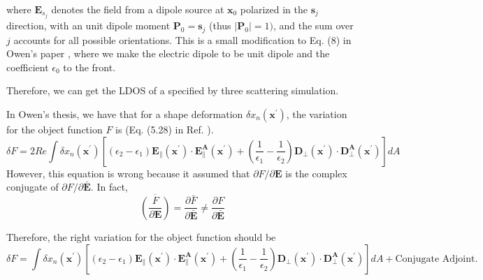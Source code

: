 \documentclass[12pt]{article}
\begin{document}
where $\mathbf{E}_{s_ j}$ denotes the field from a dipole source at $\mathbf{x}_0$ polarized in the $\mathbf{s}_j$ direction, with an unit dipole moment $\mathbf{P}_0=\mathbf{s}_j$ (thus $|\mathbf{P}_0|=1)$, and the sum over $j$ accounts for all possible orientations. This is a small modification to Eq. (8) in Owen's paper \cite{main}, where we make the electric dipole to be unit dipole and the coefficient $\epsilon_0$ to the front. 

Therefore, we can get the LDOS of a specified by three scattering simulation. %


In Owen's thesis, we have that for a shape deformation $\delta x_n(\mathbf{x}^\prime)$, the variation for the object function $F$ is (Eq. (5.28) in Ref. \cite{thesis}). 
\begin{equation}
\delta F = 2Re\int \delta x_n(\mathbf{x}^\prime) [(\epsilon_2 -\epsilon_1) \mathbf{E}_{\parallel}(\mathbf{x}^\prime)\cdot\mathbf{E}^\mathbf{A}_{\parallel}(\mathbf{x}^\prime) + (\frac{1}{\epsilon_1}-\frac{1}{\epsilon_2})\mathbf{D}_{\perp}(\mathbf{x}^\prime)\cdot\mathbf{D}^\mathbf{A}_{\perp}(\mathbf{x}^\prime)]dA
\end{equation}
However, this equation is wrong because it assumed that $\partial F/\partial \mathbf{E}$ is the complex conjugate of $\partial F/\partial \mathbf{\bar{E}}$. In fact,
\begin{equation}
\overline{(\frac{F}{\partial \mathbf{E}})}=\frac{\partial \bar{F}}{\partial\bar{\mathbf{E}}} \neq \frac{\partial F}{\partial \mathbf{\bar{E}}}
\end{equation}

Therefore, the right variation for the object function should be
\begin{equation}
\delta F = \int \delta x_n(\mathbf{x}^\prime) [(\epsilon_2 -\epsilon_1) \mathbf{E}_{\parallel}(\mathbf{x}^\prime)\cdot\mathbf{E}^\mathbf{A}_{\parallel}(\mathbf{x}^\prime) + (\frac{1}{\epsilon_1}-\frac{1}{\epsilon_2})\mathbf{D}_{\perp}(\mathbf{x}^\prime)\cdot\mathbf{D}^\mathbf{A}_{\perp}(\mathbf{x}^\prime)]dA + \text{Conjugate Adjoint}.
\end{equation}
\end{document}
